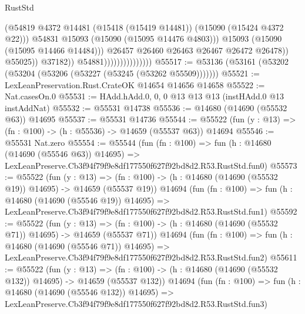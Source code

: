 \begin{lexlean}{RustStd}
\begin{coremodule}
                                                  (@54819
                                                    @4372
                                                    @14481
                                                    (@15418 (@15419 @14481))
                                                    (@15090 (@15424 @4372 @22)))
                                                  @54831
                                                  @15093
                                                  (@15090 (@15095 @14476 @4803)))
                                                @15093
                                                (@15090 (@15095 @14466 @14484)))
                                              @26457
                                              @26460
                                              @26463
                                              @26467
                                              @26472
                                              @26478))
                                          @55025))
                                      @37182))
                                  @54881)))))))))))))))
@55517 := @53136 (@53161 (@53202 (@53204 (@53206 (@53227 (@53245 (@53262 @55509)))))))
@55521 := LexLeanPreservation.Rust.CrateOK @14654 @14656 @14658
@55522 := Nat.casesOn.{0}
@55531 := HAdd.hAdd.{0, 0, 0} @13 @13 @13 (instHAdd.{0} @13 instAddNat)
@55532 := @55531 @14738
@55536 := @14680 (@14690 (@55532 @63)) @14695
@55537 := @55531 @14736
@55544 := @55522 (fun (y : @13) => (fn : @100) -> (h : @55536) -> @14659 (@55537 @63)) @14694
@55546 := @55531 Nat.zero
@55554 := @55544
    (fun (fn : @100) =>
    fun (h : @14680 (@14690 (@55546 @63)) @14695) =>
    LexLeanPreserve.Cb3f94f79f9e8df177550f627f92bd8d2.R53.RustStd.fun0)
@55573 := @55522
    (fun (y : @13) =>
    (fn : @100) -> (h : @14680 (@14690 (@55532 @19)) @14695) -> @14659 (@55537 @19))
    @14694
    (fun (fn : @100) =>
    fun (h : @14680 (@14690 (@55546 @19)) @14695) =>
    LexLeanPreserve.Cb3f94f79f9e8df177550f627f92bd8d2.R53.RustStd.fun1)
@55592 := @55522
    (fun (y : @13) =>
    (fn : @100) -> (h : @14680 (@14690 (@55532 @71)) @14695) -> @14659 (@55537 @71))
    @14694
    (fun (fn : @100) =>
    fun (h : @14680 (@14690 (@55546 @71)) @14695) =>
    LexLeanPreserve.Cb3f94f79f9e8df177550f627f92bd8d2.R53.RustStd.fun2)
@55611 := @55522
    (fun (y : @13) =>
    (fn : @100) -> (h : @14680 (@14690 (@55532 @132)) @14695) -> @14659 (@55537 @132))
    @14694
    (fun (fn : @100) =>
    fun (h : @14680 (@14690 (@55546 @132)) @14695) =>
    LexLeanPreserve.Cb3f94f79f9e8df177550f627f92bd8d2.R53.RustStd.fun3)

\end{coremodule}
\end{lexlean}
